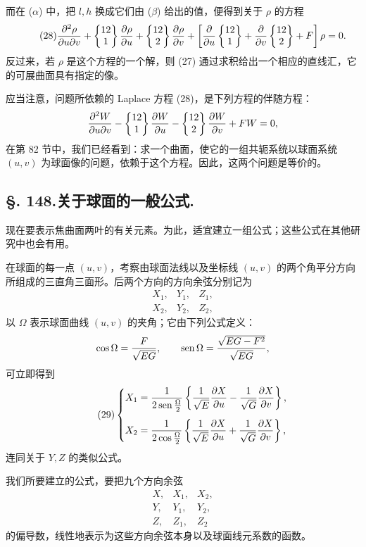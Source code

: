 而在 (\(\alpha\)) 中，把 \(l,h\) 换成它们由 (\(\beta\)) 给出的值，便得到关于 \(\rho\) 的方程
\begin{equation}\tag{28}
 \frac{\partial^2\rho}{\partial u\partial v}
 +\left\{\begin{matrix}12\\1\end{matrix}\right\}\frac{\partial\rho}{\partial u}
 +\left\{\begin{matrix}12\\2\end{matrix}\right\}\frac{\partial\rho}{\partial v}
 +\left[\frac{\partial}{\partial u}\left\{\begin{matrix}12\\1\end{matrix}\right\}
 +\frac{\partial}{\partial v}\left\{\begin{matrix}12\\2\end{matrix}\right\}+F\right]\rho=0.
\end{equation}
反过来，若 \(\rho\) 是这个方程的一个解，则 (27) 通过求积给出一个相应的直线汇，它的可展曲面具有指定的像。

应当注意，问题所依赖的 Laplace 方程 (28)，是下列方程的伴随方程：
\[
 \frac{\partial^2 W}{\partial u\partial v}
 -\left\{\begin{matrix}12\\1\end{matrix}\right\}\frac{\partial W}{\partial u}
 -\left\{\begin{matrix}12\\2\end{matrix}\right\}\frac{\partial W}{\partial v}+F W=0,
\]
在第 82 节中，我们已经看到：求一个曲面，使它的一组共轭系统以球面系统 \((u,v)\) 为球面像的问题，依赖于这个方程。因此，这两个问题是等价的。

\subsection*{\S. 148.\quad 关于球面的一般公式.}

现在要表示焦曲面两叶的有关元素。为此，适宜建立一组公式；这些公式在其他研究中也会有用。

在球面的每一点 \((u,v)\)，考察由球面法线以及坐标线 \((u,v)\) 的两个角平分方向所组成的三直角三面形。后两个方向的方向余弦分别记为
\[
\begin{array}{ccc}
X_1,&Y_1,&Z_1,\\
X_2,&Y_2,&Z_2,
\end{array}
\]
以 \(\Omega\) 表示球面曲线 \((u,v)\) 的夹角；它由下列公式定义：
\[
 \cos\Omega=\frac{F}{\sqrt{EG}},\qquad
 \operatorname{sen}\Omega=\frac{\sqrt{EG-F^2}}{\sqrt{EG}},
\]
可立即得到
\begin{equation}\tag{29}
\left\{\begin{aligned}
X_1&=\frac{1}{2\operatorname{sen}\frac\Omega2}
\left\{\frac1{\sqrt E}\frac{\partial X}{\partial u}-\frac1{\sqrt G}\frac{\partial X}{\partial v}\right\},\\[0.35em]
X_2&=\frac{1}{2\cos\frac\Omega2}
\left\{\frac1{\sqrt E}\frac{\partial X}{\partial u}+\frac1{\sqrt G}\frac{\partial X}{\partial v}\right\},
\end{aligned}
\right.
\end{equation}
连同关于 \(Y,Z\) 的类似公式。

我们所要建立的公式，要把九个方向余弦
\[
\begin{array}{ccc}
X,&X_1,&X_2,\\
Y,&Y_1,&Y_2,\\
Z,&Z_1,&Z_2
\end{array}
\]
的偏导数，线性地表示为这些方向余弦本身以及球面线元系数的函数。

